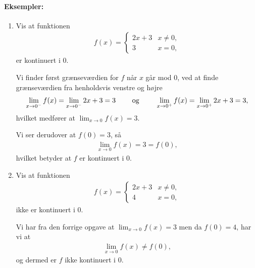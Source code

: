 \paragraph*{Eksempler:}
\begin{enumerate}
\item Vis at funktionen 
\begin{align*}
f(x)=
\begin{cases}
2x+3 & x \neq 0, \\
3 & x=0,
\end{cases}
\end{align*}
er kontinuert i $0$.

Vi finder først grænseværdien for $f$ når $x$ går mod $0$, ved at finde grænseværdien fra henholdsvis venstre og højre
\begin{align*}
\lim_{x \to 0^-} f(x) = \lim_{x \to 0^-} 2x+3=3 \qquad \textup{ og } \qquad \lim_{x \to 0^+} f(x) = \lim_{x \to 0^+} 2x+3 = 3,
\end{align*}
hvilket medfører at $\displaystyle\lim_{x \to 0} f(x) = 3$.

Vi ser derudover at $f(0)=3$, så 
\begin{align*}
\lim_{x \to 0} f(x) = 3 = f(0),
\end{align*}
hvilket betyder at $f$ er kontinuert i $0$.
\item Vis at funktionen 
\begin{align*}
f(x)=
\begin{cases}
2x+3 & x \neq 0, \\
4 & x=0,
\end{cases}
\end{align*}
ikke er kontinuert i $0$.

Vi har fra den forrige opgave at $\lim_{x \to 0} f(x)=3$ men da $f(0) = 4$, har vi at
\begin{align*}
\lim_{x \to 0} f(x) \neq f(0),
\end{align*}
og dermed er $f$ ikke kontinuert i $0$.
\end{enumerate}








